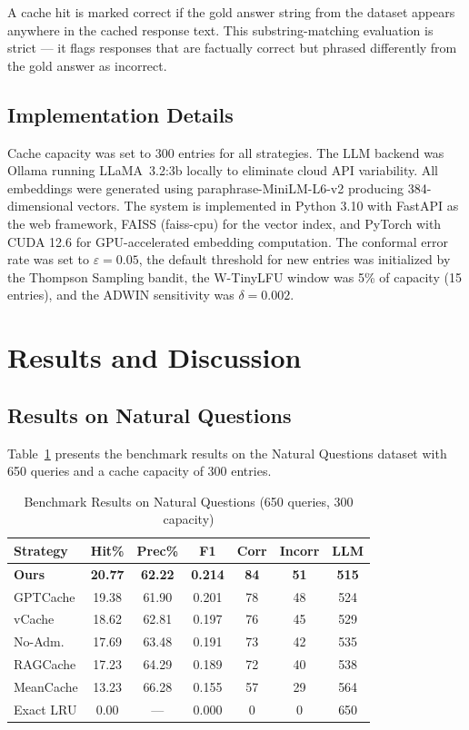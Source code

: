 \documentclass[conference]{IEEEtran}
\begin{document}
A cache hit is marked correct if the gold answer string from the dataset appears anywhere in the cached response text. This substring-matching evaluation is strict --- it flags responses that are factually correct but phrased differently from the gold answer as incorrect.

\subsection{Implementation Details}

Cache capacity was set to 300 entries for all strategies. The LLM backend was Ollama running LLaMA~3.2:3b locally to eliminate cloud API variability. All embeddings were generated using paraphrase-MiniLM-L6-v2 producing 384-dimensional vectors. The system is implemented in Python 3.10 with FastAPI as the web framework, FAISS (faiss-cpu) for the vector index, and PyTorch with CUDA 12.6 for GPU-accelerated embedding computation. The conformal error rate was set to $\varepsilon = 0.05$, the default threshold for new entries was initialized by the Thompson Sampling bandit, the W-TinyLFU window was 5\% of capacity (15 entries), and the ADWIN sensitivity was $\delta = 0.002$.

\section{Results and Discussion}

\subsection{Results on Natural Questions}

Table~\ref{tab:nq} presents the benchmark results on the Natural Questions dataset with 650 queries and a cache capacity of 300 entries.

\begin{table}[t]
\centering
\caption{Benchmark Results on Natural Questions (650 queries, 300 capacity)}
\label{tab:nq}
\begin{tabular}{lcccccc}
\toprule
\textbf{Strategy} & \textbf{Hit\%} & \textbf{Prec\%} & \textbf{F1} & \textbf{Corr} & \textbf{Incorr} & \textbf{LLM} \\
\midrule
\textbf{Ours} & \textbf{20.77} & \textbf{62.22} & \textbf{0.214} & \textbf{84} & \textbf{51} & \textbf{515} \\
GPTCache & 19.38 & 61.90 & 0.201 & 78 & 48 & 524 \\
vCache & 18.62 & 62.81 & 0.197 & 76 & 45 & 529 \\
No-Adm. & 17.69 & 63.48 & 0.191 & 73 & 42 & 535 \\
RAGCache & 17.23 & 64.29 & 0.189 & 72 & 40 & 538 \\
MeanCache & 13.23 & 66.28 & 0.155 & 57 & 29 & 564 \\
Exact LRU & 0.00 & --- & 0.000 & 0 & 0 & 650 \\
\bottomrule
\end{tabular}
\end{table}
\end{document}
